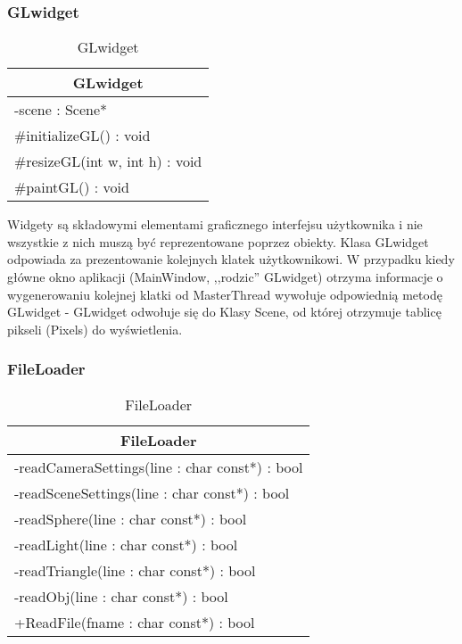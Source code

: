 \subsubsection{GLwidget}

\footnotesize
\begin{longtable}{|p{14cm}|}
    \caption{GLwidget} \label{tab:GLwidget} \\ \hline
    \multicolumn{1}{|c|}{GLwidget} \\ \hline
    -scene : Scene*  \\ \hline
    \#initializeGL() : void \\ 
    \#resizeGL(int w, int h) : void \\
    \#paintGL() : void \\ \hline
\end{longtable}
\normalsize

Widgety są składowymi elementami graficznego interfejsu użytkownika i nie wszystkie z nich muszą być reprezentowane poprzez obiekty. Klasa GLwidget odpowiada za prezentowanie kolejnych klatek użytkownikowi. W przypadku kiedy główne okno aplikacji (MainWindow, ,,rodzic'' GLwidget) otrzyma informacje o wygenerowaniu kolejnej klatki od MasterThread wywołuje odpowiednią metodę GLwidget - GLwidget odwołuje się do Klasy Scene, od której otrzymuje tablicę pikseli (Pixels) do wyświetlenia. 

\subsubsection{FileLoader}

\footnotesize
\begin{longtable}{|p{14cm}|}
    \caption{FileLoader} \label{tab:FileLoader} \\ \hline
    \multicolumn{1}{|c|}{FileLoader} \\ \hline
    -readCameraSettings(line : char const*) : bool \\
    -readSceneSettings(line : char const*) : bool \\
    -readSphere(line : char const*) : bool \\
    -readLight(line : char const*) : bool \\
    -readTriangle(line : char const*) : bool \\
    -readObj(line : char const*) : bool \\
	+ReadFile(fname : char const*) : bool \\ \hline
\end{longtable}
\normalsize

